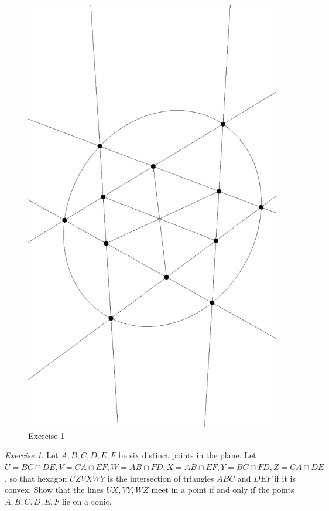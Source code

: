 \documentclass[letterpaper,11pt]{article}
\theoremstyle{definition}
\theoremstyle{remark}
\newtheorem{exer}{Exercise}
\begin{document}
\begin{figure}[!htb]
\centering
\includegraphics[scale=0.5,angle=270]{conicexer.eps}
\caption{Exercise \ref{conic-exer}}
\end{figure}

\begin{exer}\label{conic-exer} Let $A,B,C,D,E,F$ be six distinct points in the plane. Let $U = BC\cap DE, V = CA\cap EF, W = AB\cap FD, X = AB\cap EF, Y = BC\cap FD, Z = CA\cap DE$, so that hexagon $UZVXWY$ is the intersection of triangles $ABC$ and $DEF$ if it is convex. Show that the lines $UX,VY,WZ$ meet in a point if and only if the points $A,B,C,D,E,F$ lie on a conic.
\end{exer}
\end{document}
